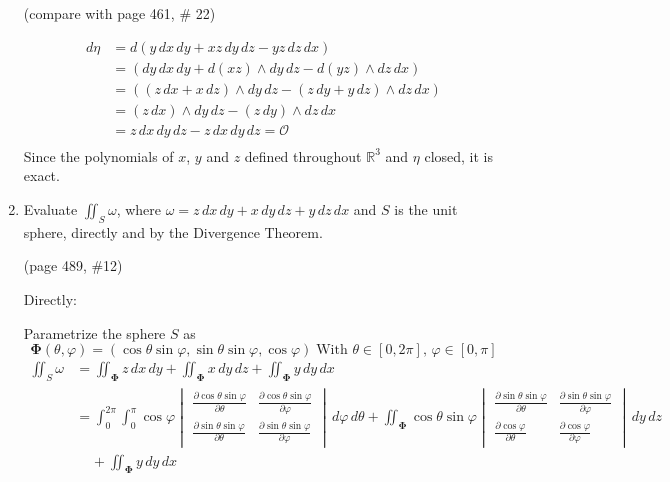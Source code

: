 \documentclass{article}
\newcommand{\partis}[2]{\frac{\partial #2}{\partial #1}}
\begin{document}
\begin{enumerate}
    (compare with page 461, \# 22)

    \begin{align*}
        d\eta &= d (y\, dx \, dy + xz \, dy \, dz - yz \, dz \, dx) \\
        &= (dy \, dx \, dy + d(xz)\wedge  dy \, dz - d(yz) \wedge dz \, dx) \\
        &= ((z \, dx + x \, dz)\wedge  dy \, dz - (z\, dy + y \, dz) \wedge dz \, dx) \\
        &= (z \, dx) \wedge dy \, dz - (z\, dy) \wedge dz \, dx \\
        &= z \, dx \, dy \, dz - z \, dx \, dy \, dz = \mathcal{O}\\
    \end{align*}
    Since the polynomials of $x$, $y$ and $z$ defined throughout $\mathbb{R}^3$ and $\eta$ closed, it is exact.
    \newpage
    \item
    Evaluate $\displaystyle \iint_S \omega$, where $\omega = z\, dx \, dy + x \, dy \, dz + y \, dz \, dx$ and $S$ is the unit sphere, directly and by the Divergence Theorem.

    (page 489, \#12)

    Directly: 
    
    Parametrize the sphere $S$ as 
    \[ \boldsymbol \Phi (\theta, \varphi) = ( \cos\theta \sin\varphi , \sin\theta \sin\varphi, \cos\varphi)\; \text{With }\theta \in [0,2\pi],\, \varphi \in [0,\pi] \]
    \begin{align*}
        \iint_S \omega &= \iint_{\boldsymbol \Phi} z \, dx \, dy + \iint_{\boldsymbol \Phi} x \, dy \, dz + \iint_{\boldsymbol \Phi} y \, dy \, dx \\
        &= \int_0^{2\pi} \int_0^{\pi} \cos \varphi \begin{vmatrix}\partis{\theta}{\cos\theta \sin \varphi} & \partis{\varphi}{\cos\theta \sin \varphi} \\ \partis{\theta}{\sin\theta \sin\varphi} & \partis{\varphi}{\sin\theta \sin\varphi} \end{vmatrix} \, d\varphi \, d\theta + \iint_{\boldsymbol \Phi} \cos\theta \sin\varphi \begin{vmatrix} \partis{\theta}{\sin\theta \sin\varphi} & \partis{\varphi}{\sin\theta \sin\varphi} \\ \partis{\theta}{\cos \varphi} & \partis{\varphi}{\cos \varphi} \end{vmatrix}\, dy \, dz \\
        & \; \; \; \; + \iint_{\boldsymbol \Phi} y \, dy \, dx \\
    \end{align*}


\end{enumerate}
\end{document}
